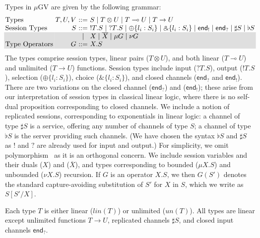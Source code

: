 \documentclass[orivec,envcountsame]{llncs}
\newcommand{\with}{\mathbin\binampersand}
\newcommand{\gvdual}[1]{\overline{#1}}
\newcommand{\gvout}[2]{{!#1.#2}}
\newcommand{\gvin}[2]{{?#1.#2}}
\newcommand{\lto}{\ensuremath{\multimap}}
\newcommand{\uto}{\ensuremath{\rightarrow}}
\newcommand{\outterm}{\mkwd{end}_!}
\newcommand{\interm}{\mkwd{end}_?}
\newcommand{\gvserver}[1]{\flat #1}
\newcommand{\gvservice}[1]{\sharp #1}
\newcommand{\mkwd}[1]{\mathsf{#1}}
\newcommand{\un}{un}
\newcommand{\lin}{lin}
\newcommand{\mugv}{$\mu\mathrm{GV}$\xspace}
\newcommand\shaderow{\noalign{\vskip-0.4pt}\rowcolor{shade}[0.6mm]}
\begin{document}
Types in \mugv are given by the following grammar:
\small
\[
\begin{array}{@{}l@{~}r@{~}c@{~}l@{}}
  \text{Types}         & T,U,V & ::= & S \mid T \otimes U \mid T \lto U \mid T \uto U \\
  \text{Session Types} & S     & ::= & \gvout{T}{S} \mid \gvin{T}{S}
                                \mid   \oplus \{ l_i : S_i \} \mid \with \{ l_i : S_i \}
                                \mid   \outterm \mid \interm 
                                \mid   \gvservice{S} \mid \gvserver{S} \\ \shaderow
                            & & \mid & X \mid \gvdual{X}
                                \mid   {\mu G} \mid {\nu G} \\  \shaderow
  \text{Type Operators} & G    & ::= & X.S \\
\end{array}
\]\normalsize%
%
The types comprise session types, linear pairs ($T \otimes U$), and both linear ($T \lto U$) and
unlimited ($T \uto U$) functions.
%
Session types include input ($\gvin{T}{S}$), output ($\gvout{T}{S}$), selection ($\oplus\{ l_i:S_i
\}$), choice ($\with\{l_i:S_i\}$), and closed channels ($\interm$ and $\outterm$). There are two
variations on the closed channel ($\interm$) and ($\outterm$); these arise from our interpretation
of session types in classical linear logic, where there is no self-dual proposition corresponding to
closed channels.  We include a notion of replicated sessions, corresponding to exponentials in
linear logic: a channel of type $\gvservice{S}$ is a service, offering any number of channels of
type $S$; a channel of type $\gvserver{S}$ is the server providing such channels. (We have chosen
the syntax $\gvserver{S}$ and $\gvservice{S}$ as $!$ and $?$ are already used for input and output.)
%
For simplicity, we omit polymorphism~\citep{LindleyM14} as it is an orthogonal concern.
%
We include session variables and their duals ($X$) and ($\gvdual{X}$), and types corresponding to
bounded ($\mu X.S$) and unbounded ($\nu X.S$) recursion. If $G$ is an operator $X.S$, we then
$G(S')$ denotes the standard capture-avoiding substitution of $S'$ for $X$ in $S$, which we write as
$S[S'/X]$.

Each type $T$ is either linear ($\lin(T)$) or unlimited ($\un(T)$).
All types are linear except unlimited functions $T \uto U$, replicated channels $\gvservice{S}$, and
closed input channels $\interm$.
\end{document}
